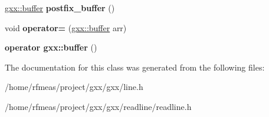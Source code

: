 \begin{DoxyCompactItemize}
\item 
\hyperlink{classgxx_1_1buffer}{gxx\+::buffer} {\bfseries postfix\+\_\+buffer} ()\hypertarget{classgxx_1_1line_a3215cf596bf9673afc075100be863613}{}\label{classgxx_1_1line_a3215cf596bf9673afc075100be863613}

\item 
void {\bfseries operator=} (\hyperlink{classgxx_1_1buffer}{gxx\+::buffer} arr)\hypertarget{classgxx_1_1line_a764de8273b3053e301879551d8cb93a2}{}\label{classgxx_1_1line_a764de8273b3053e301879551d8cb93a2}

\item 
{\bfseries operator gxx\+::buffer} ()\hypertarget{classgxx_1_1line_a82bfb75d0e5610187d9a41403d3273f6}{}\label{classgxx_1_1line_a82bfb75d0e5610187d9a41403d3273f6}

\end{DoxyCompactItemize}


The documentation for this class was generated from the following files\+:\begin{DoxyCompactItemize}
\item 
/home/rfmeas/project/gxx/gxx/line.\+h\item 
/home/rfmeas/project/gxx/gxx/readline/readline.\+h\end{DoxyCompactItemize}
